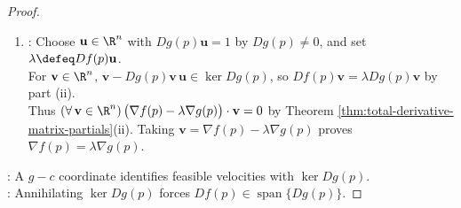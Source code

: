 \begin{samepage}
\begin{theorem}
\begin{proof}
\begin{enumerate}[label=(\roman*)]
\item {}: Choose $\mathbf u\in\R^n$ with $Dg(p)\mathbf u=1$ by $Dg(p)\neq0$, and set $\lambda\defeq Df(p)\mathbf u$.\\
For $\mathbf v\in\R^n$, $\mathbf v-Dg(p)\mathbf v\,\mathbf u\in\ker Dg(p)$, so $Df(p)\mathbf v=\lambda Dg(p)\mathbf v$ by part (ii).\\
Thus $(\forall\,\mathbf v\in\R^n)\,\bigl(\nabla f(p)-\lambda\nabla g(p)\bigr)\cdot\mathbf v=0$ by Theorem \ref{thm:total-derivative-matrix-partials}(ii). Taking $\mathbf v=\nabla f(p)-\lambda\nabla g(p)$ proves $\nabla f(p)=\lambda\nabla g(p)$.
\end{enumerate}
: A $g-c$ coordinate identifies feasible velocities with $\ker Dg(p)$.\\
: Annihilating $\ker Dg(p)$ forces $Df(p)\in\operatorname{span}\{Dg(p)\}$.
\end{proof}
\end{theorem}
\end{samepage}
